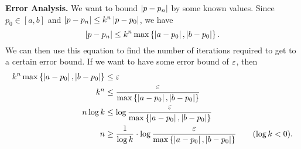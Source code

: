 \documentclass[class=article, crop=false]{standalone}
\begin{document}
  \textbf{Error Analysis.} We want to bound $\left\lvert p - p_n \right\rvert$ by some known values. Since $p_0\in [a, b]$ and $\left\lvert p - p_n \right\rvert \leq k^n\left\lvert p - p_0 \right\rvert$, we have
  \[
    \left\lvert p - p_n \right\rvert \leq k^n \max\left\{\left\lvert a - p_0 \right\rvert, \left\lvert b - p_0 \right\rvert\right\}.
  \]
  We can then use this equation to find the number of iterations required to get to a certain error bound. If we want to have some error bound of $\varepsilon$, then
  \begin{align*}
    k^n\max \left\{\left\lvert a - p_0 \right\rvert, \left\lvert b - p_0 \right\rvert\right\} &\leq \varepsilon \\
    k^n &\leq \frac{\varepsilon}{\max\left\{\left\lvert a - p_0 \right\rvert, \left\lvert b - p_0 \right\rvert\right\}} \\
    n\log k &\leq \log \frac{\varepsilon}{\max\left\{\left\lvert a - p_0 \right\rvert, \left\lvert b - p_0 \right\rvert\right\}} \\
    n &\geq \frac{1}{\log k}\cdot \log \frac{\varepsilon}{\max\left\{\left\lvert a - p_0 \right\rvert, \left\lvert b - p_0 \right\rvert\right\}} \tag{$\log k < 0$}.
  \end{align*}
\end{document}
